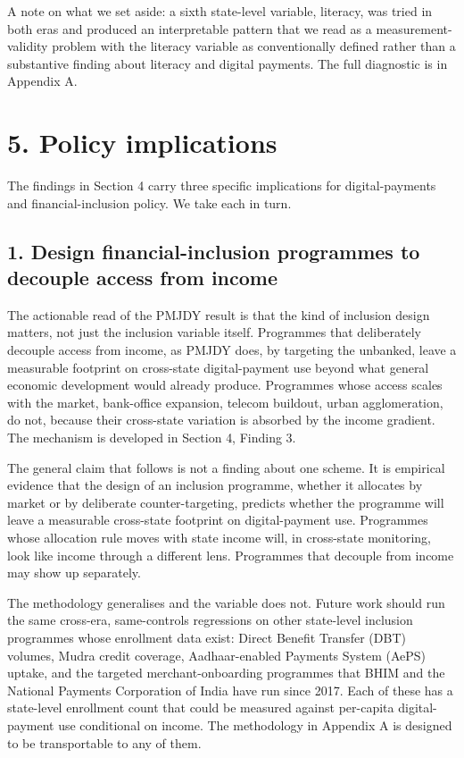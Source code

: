 \documentclass[
]{article}
\begin{document}
A note on what we set aside: a sixth state-level variable, literacy, was
tried in both eras and produced an interpretable pattern that we read as
a measurement-validity problem with the literacy variable as
conventionally defined rather than a substantive finding about literacy
and digital payments. The full diagnostic is in Appendix A.

\section{5. Policy implications}\label{policy-implications}

The findings in Section 4 carry three specific implications for
digital-payments and financial-inclusion policy. We take each in turn.

\subsection{1. Design financial-inclusion programmes to decouple access
from
income}\label{design-financial-inclusion-programmes-to-decouple-access-from-income}

The actionable read of the PMJDY result is that the kind of inclusion
design matters, not just the inclusion variable itself. Programmes that
deliberately decouple access from income, as PMJDY does, by targeting
the unbanked, leave a measurable footprint on cross-state
digital-payment use beyond what general economic development would
already produce. Programmes whose access scales with the market,
bank-office expansion, telecom buildout, urban agglomeration, do not,
because their cross-state variation is absorbed by the income gradient.
The mechanism is developed in Section 4, Finding 3.

The general claim that follows is not a finding about one scheme. It is
empirical evidence that the design of an inclusion programme, whether it
allocates by market or by deliberate counter-targeting, predicts whether
the programme will leave a measurable cross-state footprint on
digital-payment use. Programmes whose allocation rule moves with state
income will, in cross-state monitoring, look like income through a
different lens. Programmes that decouple from income may show up
separately.

The methodology generalises and the variable does not. Future work
should run the same cross-era, same-controls regressions on other
state-level inclusion programmes whose enrollment data exist: Direct
Benefit Transfer (DBT) volumes, Mudra credit coverage, Aadhaar-enabled
Payments System (AePS) uptake, and the targeted merchant-onboarding
programmes that BHIM and the National Payments Corporation of India have
run since 2017. Each of these has a state-level enrollment count that
could be measured against per-capita digital-payment use conditional on
income. The methodology in Appendix A is designed to be transportable to
any of them.
\end{document}
